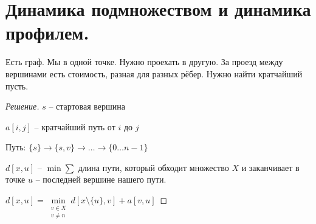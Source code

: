 \documentclass{book}
\theoremstyle{definition}
\begin{document}
\section{Динамика подмножеством и динамика профилем.}

\begin{problem}

    Есть граф. Мы в одной точке. Нужно проехать в другую. За проезд между вершинами есть стоимость, разная для разных рёбер. Нужно найти кратчайший пусть.

\end{problem}
\begin{proof}
    [Решение]

    $s$ -- стартовая вершина

    $a[i,j]$ -- кратчайший путь от  $i$ до  $j$

    Путь: $\{s\} \to \{s,v\} \to \ldots \to \{0\ldots n-1\}$

    $d[x,u]$ --  $\min\sum$ длина пути, который обходит множество  $X$ и заканчивает в точке  $u$ -- последней вершине нашего пути.

    $d[x,u] = \min\limits_{\substack{v\in X \\ v\neq n}}d[x\setminus \{u\},v] + a[v,u]$
\end{proof}
\end{document}
